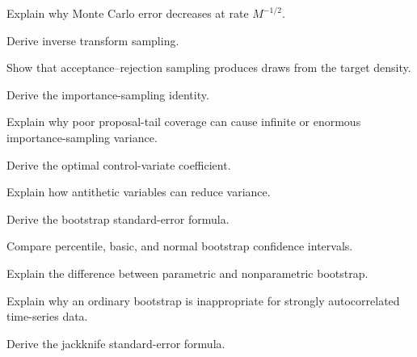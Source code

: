 \begin{exercise}[3]
Explain why Monte Carlo error decreases at rate \(M^{-1/2}\).
\end{exercise}

\begin{exercise}[3]
Derive inverse transform sampling.
\end{exercise}

\begin{exercise}[3]
Show that acceptance--rejection sampling produces draws from the target
density.
\end{exercise}

\begin{exercise}[3]
Derive the importance-sampling identity.
\end{exercise}

\begin{exercise}[3]
Explain why poor proposal-tail coverage can cause infinite or enormous
importance-sampling variance.
\end{exercise}

\begin{exercise}[3]
Derive the optimal control-variate coefficient.
\end{exercise}

\begin{exercise}[3]
Explain how antithetic variables can reduce variance.
\end{exercise}

\begin{exercise}[3]
Derive the bootstrap standard-error formula.
\end{exercise}

\begin{exercise}[3]
Compare percentile, basic, and normal bootstrap confidence intervals.
\end{exercise}

\begin{exercise}[3]
Explain the difference between parametric and nonparametric bootstrap.
\end{exercise}

\begin{exercise}[3]
Explain why an ordinary bootstrap is inappropriate for strongly
autocorrelated time-series data.
\end{exercise}

\begin{exercise}[3]
Derive the jackknife standard-error formula.
\end{exercise}

